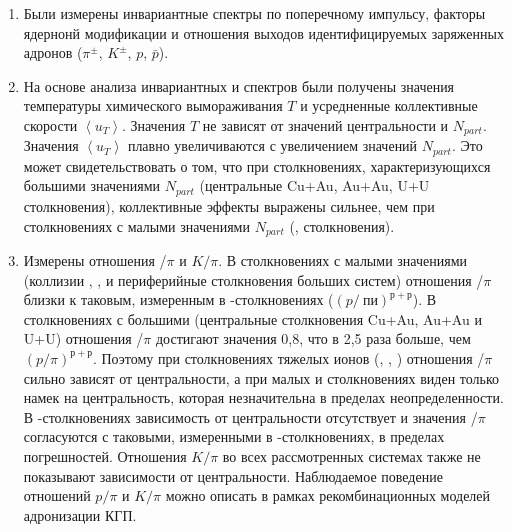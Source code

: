 \begin{enumerate}
\item Были измерены инвариантные спектры по поперечному импульсу, факторы ядернонй модификации и отношения выходов идентифицируемых заряженных адронов ($\pi^\pm$, $K^\pm$, $p$, $\bar{p}$).

\item На основе анализа инвариантных \pt и \mt спектров были получены значения температуры химического вымораживания $T$ и усредненные коллективные скорости $\left< u_T \right>$. Значения  $T$ не зависят от значений центральности и $N_{part}$.
Значения  $\left< u_T \right>$ плавно увеличиваются с увеличением значений $N_{part}$.
Это может свидетельствовать о том, что при столкновениях, характеризующихся большими значениями $N_{part}$ (центральные Cu+Au, Au+Au, U+U столкновения), коллективные эффекты выражены сильнее, чем при столкновениях с малыми значениями $N_{part}$ (\pal, \heau столкновения).

\item Измерены отношения \prot/$\pi$ и $K/\pi$.
В столкновениях с малыми значениями \Npart (коллизии \pal, \heau, \dau и периферийные столкновения больших систем) отношения \prot/$\pi$ близки к таковым, измеренным в \pp-столкновениях ($(p/\ пи)^{р+р}$). В столкновениях с большими \Npart (центральные столкновения Cu+Au, Au+Au и U+U) отношения \prot/$\pi$ достигают значения 0,8, что в 2,5 раза больше, чем $(p/\pi)^{ р+р}$. Поэтому при столкновениях тяжелых ионов (\cuau, \auau, \uu) отношения \prot/$\pi$ сильно зависят от центральности, а при малых \heau и \dau столкновениях виден только намек на центральность, которая незначительна в пределах неопределенности. В \pal-столкновениях зависимость от центральности отсутствует и значения \prot/$\pi$ согласуются с таковыми, измеренными в \pp-столкновениях, в пределах погрешностей.
Отношения $K/\pi$ во всех рассмотренных системах также не показывают зависимости от центральности.
Наблюдаемое поведение отношений $p/\pi$ и $K/\pi$ можно описать в рамках рекомбинационных моделей адронизации КГП.


\end{enumerate}
